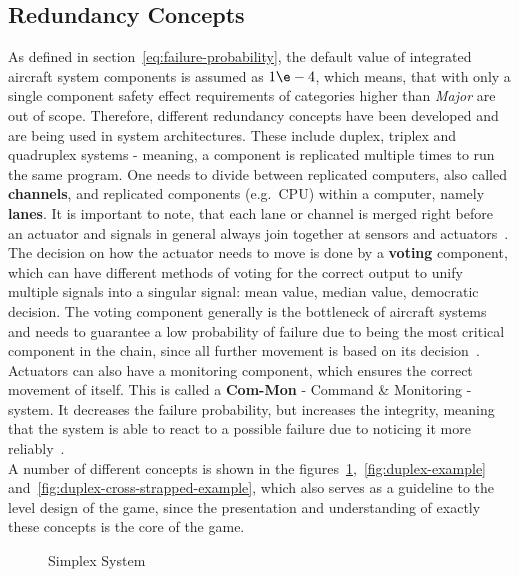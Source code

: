 \subsection{Redundancy Concepts}\label{subsec:redundancy-concepts}
As defined in section~\ref{eq:failure-probability}, the default value of integrated aircraft system components is assumed as
$1\e-4$, which means, that with only a single component safety effect requirements of categories higher than \textit{Major} are out of scope.
Therefore, different redundancy concepts have been developed and are being used in system architectures.
These include duplex, triplex and quadruplex systems - meaning, a component is replicated multiple times to run the same program.
One needs to divide between replicated computers, also called \textbf{channels}, and replicated components (e.g.\ \gls{CPU}) within a computer,
namely \textbf{lanes}.
It is important to note, that each lane or channel is merged right before an actuator and signals in general always join together
at sensors and actuators~\cite{lfs1}.
\\
The decision on how the actuator needs to move is done by a \textbf{voting} component, which can have different methods of voting
for the correct output to unify multiple signals into a singular signal: mean value, median value, democratic decision.
The voting component generally is the bottleneck of aircraft systems and needs to guarantee a low probability of failure
due to being the most critical component in the chain, since all further movement is based on its decision~\cite{lfs1}.
\\
Actuators can also have a monitoring component, which ensures the correct movement of itself.
This is called a \textbf{Com-Mon} - Command \& Monitoring - system.
It decreases the failure probability, but increases the integrity, meaning that the system is able to react to a possible failure due
to noticing it more reliably~\cite{lfs1}.
\\
A number of different concepts is shown in the figures~\ref{fig:simplex-example},~\ref{fig:duplex-example} and~\ref{fig:duplex-cross-strapped-example},
which also serves as a guideline to the level design of the game,
since the presentation and understanding of exactly these concepts is the core of the game.
\begin{figure}
    \begin{center}
    \end{center}
    \caption{Simplex System}
    \label{fig:simplex-example}
\end{figure}
